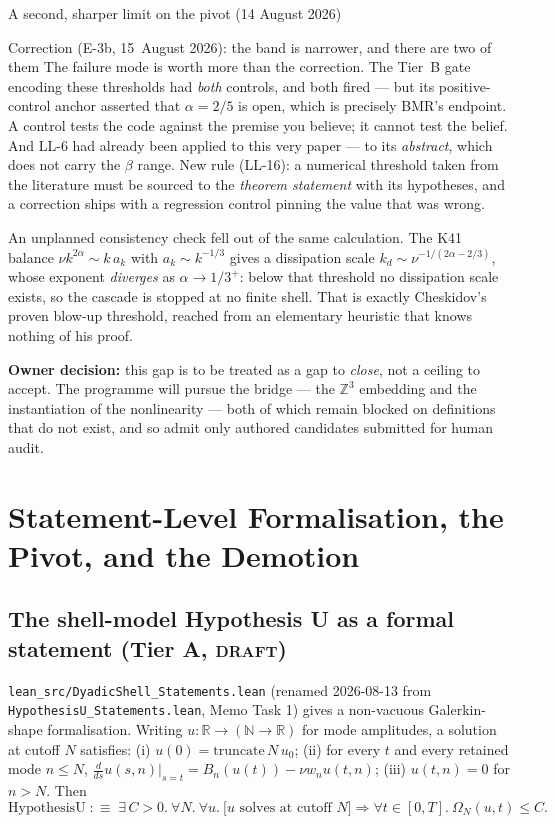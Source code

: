 \documentclass[11pt,a4paper]{article}
\newcommand{\tA}{\textcolor{TierA}{\textbf{Tier A}}}
\newcommand{\Z}{\mathbb{Z}}
\newcommand{\N}{\mathbb{N}}
\newcommand{\R}{\mathbb{R}}
\theoremstyle{definition}
\theoremstyle{plain}
\begin{document}
\begin{warnbox}{A second, sharper limit on the pivot (14 August 2026)}
\begin{keybox}{Correction (E-3b, 15~August 2026): the band is narrower, and there are two of them}
The failure mode is worth more than the correction. The Tier~B gate encoding these thresholds
had \emph{both} controls, and both fired --- but its positive-control anchor asserted that
$\alpha=2/5$ is open, which is precisely BMR's endpoint. A control tests the code against the
premise you believe; it cannot test the belief. And LL-6 had already been applied to this very
paper --- to its \emph{abstract}, which does not carry the $\beta$ range. New rule (LL-16): a
numerical threshold taken from the literature must be sourced to the \emph{theorem statement}
with its hypotheses, and a correction ships with a regression control pinning the value that
was wrong.
\end{keybox}

An unplanned consistency check fell out of the same calculation. The K41 balance
$\nu k^{2\alpha}\sim k\,a_k$ with $a_k\sim k^{-1/3}$ gives a dissipation scale
$k_d\sim\nu^{-1/(2\alpha-2/3)}$, whose exponent \emph{diverges} as $\alpha\to1/3^+$: below that
threshold no dissipation scale exists, so the cascade is stopped at no finite shell. That is
exactly Cheskidov's proven blow-up threshold, reached from an elementary heuristic that knows
nothing of his proof.

\textbf{Owner decision:} this gap is to be treated as a gap to \emph{close}, not a ceiling to
accept. The programme will pursue the bridge --- the $\Z^3$ embedding and the instantiation of
the nonlinearity --- both of which remain blocked on definitions that do not exist, and so
admit only authored candidates submitted for human audit.
\end{warnbox}

\section{Statement-Level Formalisation, the Pivot, and the Demotion}
\label{sec:audit}

\subsection{The shell-model Hypothesis U as a formal statement (\tA{}, \textsc{draft})}

\texttt{lean\_src/DyadicShell\_Statements.lean} (renamed 2026-08-13 from
\texttt{HypothesisU\_Statements.lean}, Memo Task 1) gives a non-vacuous Galerkin-shape
formalisation. Writing $u:\R\to(\N\to\R)$ for mode amplitudes, a solution at cutoff $N$
satisfies: (i) $u(0)=\mathrm{truncate}\,N\,u_0$; (ii) for every $t$ and every retained mode
$n\le N$, $\frac{d}{ds}u(s,n)|_{s=t}=B_n(u(t))-\nu w_n u(t,n)$; (iii) $u(t,n)=0$ for $n>N$.
Then
\begin{equation}
\mathrm{HypothesisU} \;:\equiv\;
\exists\,C>0.\ \forall N.\ \forall u.\ \bigl[\text{$u$ solves at cutoff $N$}\bigr]
\Rightarrow \forall t\in[0,T].\ \Omega_N(u,t)\le C .
\label{eq:formalU}
\end{equation}
\end{document}
